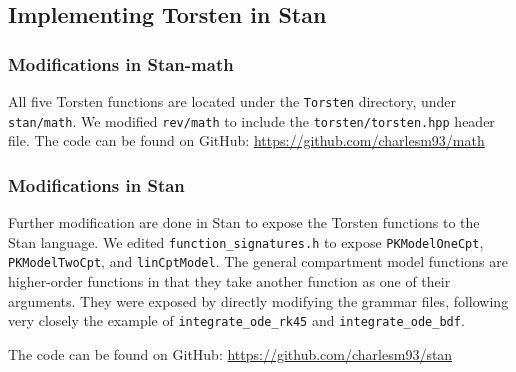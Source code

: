 \documentclass[11pt]{amsart}
\begin{document}
\subsection*{Implementing Torsten in Stan}
\subsubsection*{Modifications in Stan-math}
All five Torsten functions are located under the \texttt{Torsten} directory, under \texttt{stan/math}. We modified \texttt{rev/math} to include the \texttt{torsten/torsten.hpp} header file. The code can be found on GitHub: \url{https://github.com/charlesm93/math} 

\subsubsection*{Modifications in Stan}
Further modification are done in Stan to expose the Torsten functions to the Stan language. We edited \texttt{function\_signatures.h} to expose \texttt{PKModelOneCpt}, \texttt{PKModelTwoCpt}, and \texttt{linCptModel}. The general compartment model functions are higher-order functions in that they take another function as one of their arguments. They were exposed by directly modifying the grammar files, following very closely the example of \texttt{integrate\_ode\_rk45} and \texttt{integrate\_ode\_bdf}.

The code can be found on GitHub:  \url{https://github.com/charlesm93/stan}




\end{document}
